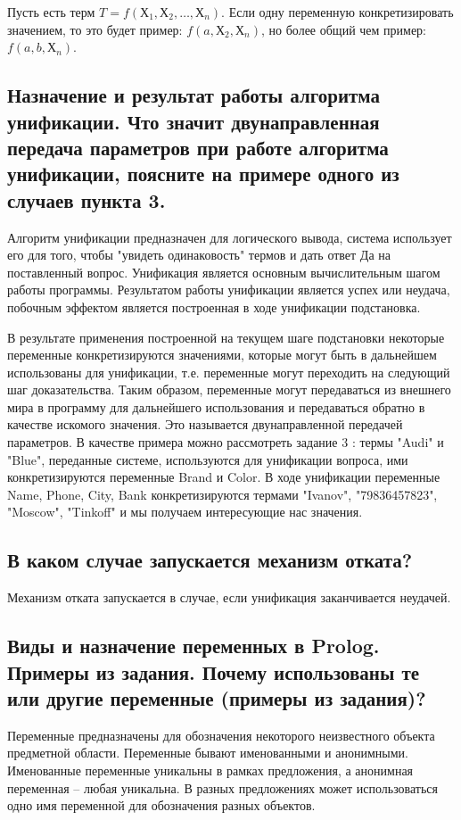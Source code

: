 \documentclass[a4paper,12pt]{article}
\begin{document}
Пусть есть терм $T=f(Х_1, Х_2, \dots, Х_n)$. Если одну переменную конкретизировать значением, то это будет пример: $f(a, Х_2, Х_n)$, но более общий чем пример: $f(a, b, Х_n)$.
\subsection*{Назначение и результат работы алгоритма унификации. Что значит двунаправленная передача параметров при работе алгоритма унификации, поясните на примере одного из случаев пункта  3.}

Алгоритм унификации предназначен для логического вывода, система использует его для того, чтобы "увидеть одинаковость" термов и дать ответ Да на поставленный вопрос. Унификация является основным вычислительным шагом работы программы. Результатом работы унификации является успех или неудача, побочным эффектом является построенная в ходе унификации подстановка.

В результате применения построенной на текущем шаге подстановки некоторые переменные конкретизируются значениями, которые могут быть в дальнейшем использованы для унификации, т.е. переменные могут переходить на следующий шаг доказательства. Таким образом, переменные могут передаваться из внешнего мира в программу для дальнейшего использования и передаваться обратно в качестве искомого значения. Это называется двунаправленной передачей параметров. В качестве примера можно рассмотреть задание 3 : термы "Audi" и "Blue", переданные системе, используются для унификации вопроса, ими конкретизируются переменные Brand и Color. В ходе унификации переменные Name, Phone, City, Bank конкретизируются термами "Ivanov"{}, "79836457823"{}, "Moscow"{}, "Tinkoff"{} и мы получаем интересующие нас значения.
\subsection*{В каком случае запускается механизм отката?}

Механизм отката запускается в случае, если унификация заканчивается неудачей.

\subsection*{Виды и назначение переменных в Prolog. Примеры из задания.  Почему использованы те или другие переменные (примеры из задания)?}

Переменные предназначены для обозначения некоторого неизвестного объекта предметной области. Переменные бывают именованными и анонимными. Именованные переменные уникальны в рамках предложения, а анонимная переменная – любая уникальна. В разных предложениях может использоваться одно имя переменной для обозначения разных объектов.
\end{document}
